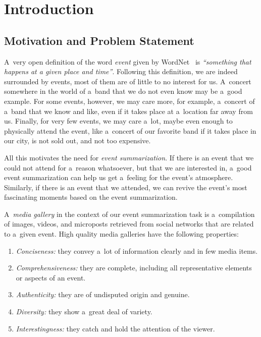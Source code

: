 \chapter{Introduction}

\ifpdf
    \graphicspath{{1_introduction/figures/PNG/}{1_introduction/figures/PDF/}{1_introduction/figures/}}
\else
    \graphicspath{{1_introduction/figures/EPS/}{1_introduction/figures/}}
\fi

\section{Motivation and Problem Statement}

A~very open definition of the word \emph{event}
given by WordNet~\cite{Princeton:WordNet} is
\emph{``something that happens at a given place and time''}.
Following this definition,
we are indeed surrounded by events, most of them
are of little to no interest for us.
A~concert somewhere in the world of a~band
that we do not even know may be a~good example.
For some events, however, we may care more, for example,
a~concert of a~band that we know and like,
even if it takes place at a~location far away from us.
Finally, for very few events, we may care a~lot,
maybe even enough to physically attend the event,
like a~concert of our favorite band
if it takes place in our city, is not sold out,
and not too expensive.

All this motivates the need for \emph{event summarization}.
If there is an event that we could not attend
for a~reason whatsoever,
but that we are interested in,
a~good event summarization can help us get a~feeling
for the event's atmosphere.
Similarly, if there is an event that we attended,
we can revive the event's most fascinating moments
based on the event summarization.

A~\emph{media gallery} in the context of
our event summarization task is
a~compilation of images, videos,
and microposts retrieved from social networks
that are related to a~given event.
High quality media galleries have the following properties:

\begin{enumerate}
  \item \textit{Conciseness:}
        they convey a~lot of information clearly
        and in few media items.
  \item \textit{Comprehensiveness:}
        they are complete, including all representative
        elements or aspects of an event.
  \item \textit{Authenticity:}
        they are of undisputed origin and genuine.
  \item \textit{Diversity:}
        they show a~great deal of variety.
  \item \textit{Interestingness:}
        they catch and hold the attention of the viewer.     
\end{enumerate}

